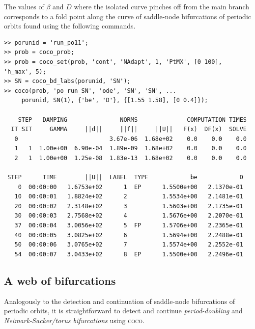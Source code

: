 The values of $\beta$ and $D$ where the isolated curve pinches off from the main branch corresponds to a fold point along the curve of saddle-node bifurcations of periodic orbits found using the following commands.
\begin{lstlisting}[language=coco-highlight,frame=lines]
>> porunid = 'run_po11';
>> prob = coco_prob;
>> prob = coco_set(prob, 'cont', 'NAdapt', 1, 'PtMX', [0 100], 'h_max', 5);
>> SN = coco_bd_labs(porunid, 'SN');
>> coco(prob, 'po_run_SN', 'ode', 'SN', 'SN', ...
     porunid, SN(1), {'be', 'D'}, {[1.55 1.58], [0 0.4]});
     
    STEP   DAMPING               NORMS              COMPUTATION TIMES
  IT SIT     GAMMA     ||d||     ||f||     ||U||   F(x)  DF(x)  SOLVE
   0                          3.67e-06  1.68e+02    0.0    0.0    0.0
   1   1  1.00e+00  6.90e-04  1.89e-09  1.68e+02    0.0    0.0    0.0
   2   1  1.00e+00  1.25e-08  1.83e-13  1.68e+02    0.0    0.0    0.0

 STEP      TIME        ||U||  LABEL  TYPE            be            D
    0  00:00:00   1.6753e+02      1  EP      1.5500e+00   2.1370e-01
   10  00:00:01   1.8824e+02      2          1.5534e+00   2.1481e-01
   20  00:00:02   2.3148e+02      3          1.5603e+00   2.1735e-01
   30  00:00:03   2.7568e+02      4          1.5676e+00   2.2070e-01
   37  00:00:04   3.0056e+02      5  FP      1.5706e+00   2.2365e-01
   40  00:00:05   3.0825e+02      6          1.5694e+00   2.2488e-01
   50  00:00:06   3.0765e+02      7          1.5574e+00   2.2552e-01
   54  00:00:07   3.0433e+02      8  EP      1.5500e+00   2.2496e-01
\end{lstlisting}


\subsection{A web of bifurcations}
\label{sec: A web of bifurcations}
Analogously to the detection and continuation of saddle-node bifurcations of periodic orbits, it is straightforward to detect and continue \textit{period-doubling} and \textit{Neimark-Sacker/torus bifurcations} using \textsc{coco}. 

